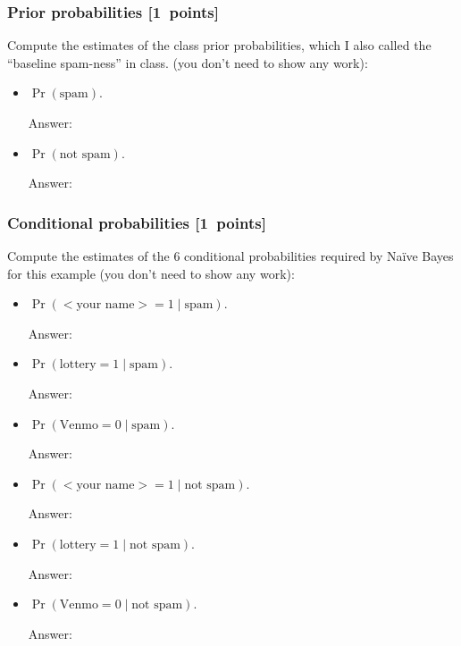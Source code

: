 \documentclass{article}
\newcommand{\blu}[1]{{\textcolor{blu}{#1}}}
\newenvironment{answer}{\par\begingroup\color{gre}Answer: }{\endgroup}
\let\ask\blu
\newcommand\pts[1]{\textcolor{pointscolour}{[#1~points]}}
\begin{document}
    \subsubsection{Prior probabilities \pts{1}}
    \ask{Compute the estimates of the class prior probabilities, which I also called the ``baseline spam-ness'' in class.} (you don't need to show any work):
    \begin{itemize}
        \item $\Pr(\text{spam})$.
        \begin{answer}

        \end{answer}
        \item $\Pr(\text{not spam})$.
        \begin{answer}

        \end{answer}
    \end{itemize}

    \subsubsection{Conditional probabilities \pts{1}}

    \ask{Compute the estimates of the 6 conditional probabilities required by Na\"ive Bayes for this example}  (you don't need to show any work):
    \begin{itemize}
        \item $\Pr(\text{$<$your name$>$} = 1  \mid \text{spam})$.
        \begin{answer}

        \end{answer}
        \item $\Pr(\text{lottery} = 1 \mid \text{spam})$.
        \begin{answer}

        \end{answer}
        \item $\Pr(\text{Venmo} = 0  \mid \text{spam})$.
        \begin{answer}

        \end{answer}
        \item $\Pr(\text{$<$your name$>$} = 1  \mid \text{not spam})$.
        \begin{answer}

        \end{answer}
        \item $\Pr(\text{lottery} = 1  \mid \text{not spam})$.
        \begin{answer}

        \end{answer}
        \item $\Pr(\text{Venmo} = 0  \mid \text{not spam})$.
        \begin{answer}

        \end{answer}
    \end{itemize}
\end{document}
